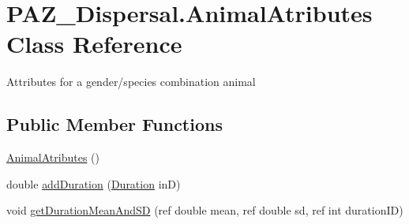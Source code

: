 \hypertarget{class_p_a_z___dispersal_1_1_animal_atributes}{\section{P\-A\-Z\-\_\-\-Dispersal.\-Animal\-Atributes Class Reference}
\label{class_p_a_z___dispersal_1_1_animal_atributes}
}


Attributes for a gender/species combination animal  


\subsection*{Public Member Functions}
\begin{DoxyCompactItemize}
\item 
\hyperlink{class_p_a_z___dispersal_1_1_animal_atributes_a89ebe46fb2d4f6d23b2b0069d2737829}{Animal\-Atributes} ()
\item 
double \hyperlink{class_p_a_z___dispersal_1_1_animal_atributes_a84e805ec36226e94c277dd6f137ef0ff}{add\-Duration} (\hyperlink{struct_p_a_z___dispersal_1_1_duration}{Duration} in\-D)
\item 
void \hyperlink{class_p_a_z___dispersal_1_1_animal_atributes_a45caab357a751b7e4a0f8b77e0090d4e}{get\-Duration\-Mean\-And\-S\-D} (ref double mean, ref double sd, ref int duration\-I\-D)
\end{DoxyCompactItemize}
